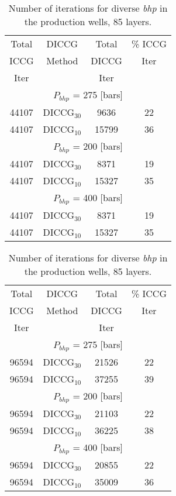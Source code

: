 \documentclass[12pt]{article}
\begin{document}
{\begin{table}[!ht]
\hspace{-1cm}
\begin{minipage}{0.45\textwidth}
 \centering
\begin{tabular}{ ||c|c|c|c||} 
\hline
Total&DICCG &Total &\% ICCG\\ 
ICCG& Method&DICCG &Iter\\ 
 Iter&        &Iter & \\
\hline  
\multicolumn{4}{||c||}{$P_{bhp}$ = 275 [bars]}\\
\hline 
44107& DICCG$_{30}$&9636&22 \\ 
\hline  
44107& DICCG$_{10}$&15799&36\\ 
\hline    
\multicolumn{4}{||c||}{$P_{bhp}$ = 200 [bars]}\\
\hline 
44107& DICCG$_{30}$&8371&19 \\ 
\hline  
44107& DICCG$_{10}$&15327&35\\ 
\hline   
\multicolumn{4}{||c||}{$P_{bhp}$ = 400 [bars]}\\
\hline
44107& DICCG$_{30}$&8371&19 \\ 
\hline  
44107& DICCG$_{10}$&15327&35 \\ 
\hline 
\end{tabular} 
\caption{Number of iterations for diverse \emph{bhp} in the production wells, 35 layers. }\label{table:litertotSPE_t} 
\end{minipage} %
\hspace{0.1cm}
\begin{minipage}{0.45\textwidth}
 \centering
\begin{tabular}{ ||c|c|c|c||} 
\hline
Total&DICCG &Total &\% ICCG\\ 
ICCG& Method&DICCG &Iter\\ 
 Iter&        &Iter & \\
\hline  
\multicolumn{4}{||c||}{$P_{bhp}$ = 275 [bars]}\\
\hline 
96594& DICCG$_{30}$&21526&22 \\ 
\hline  
96594& DICCG$_{10}$&37255&39 \\ 
\hline    
\multicolumn{4}{||c||}{$P_{bhp}$ = 200 [bars]}\\
\hline 
96594& DICCG$_{30}$&21103&22 \\ 
\hline  
96594& DICCG$_{10}$&36225&38 \\ 
\hline   
\multicolumn{4}{||c||}{$P_{bhp}$ = 400 [bars]}\\
\hline  
96594& DICCG$_{30}$&20855&22\\ 
\hline
96594& DICCG$_{10}$&35009&36 \\ 
\hline  
\end{tabular} 
\caption{Number of iterations for diverse \emph{bhp} in the production wells, 85 layers. }\label{table:litertotSPE_t85} 
\end{minipage} 
\end{table}  


}
\end{document}
